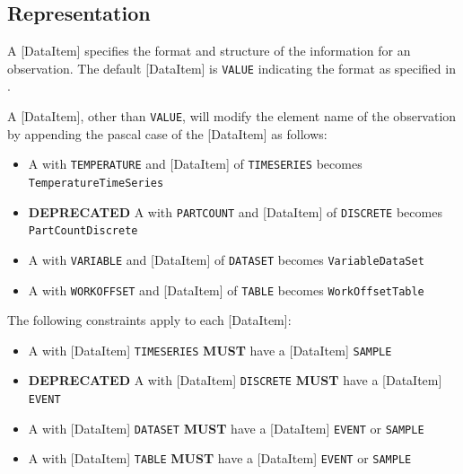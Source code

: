 \subsection{Representation} \label{sec:Representation}


A [DataItem] specifies the format and structure of the information for an \gls{observation}. The default [DataItem] is \texttt{VALUE} indicating the format as specified in .

A [DataItem], other than \texttt{VALUE}, will modify the element name of the \gls{observation} by appending the pascal case of the [DataItem] as follows:


\begin{itemize}
    \item A  with  \texttt{TEMPERATURE} and [DataItem] of \texttt{TIME\textunderscore SERIES} becomes \texttt{TemperatureTimeSeries}


    \item \textbf{DEPRECATED} A  with  \texttt{PART\textunderscore COUNT} and [DataItem] of \texttt{DISCRETE} becomes \texttt{PartCountDiscrete}


    \item A  with  \texttt{VARIABLE} and [DataItem] of \texttt{DATA\textunderscore SET} becomes \texttt{VariableDataSet}


    \item A  with  \texttt{WORK\textunderscore OFFSET} and [DataItem] of \texttt{TABLE} becomes \texttt{WorkOffsetTable}


\end{itemize}

The following constraints apply to each [DataItem]:


\begin{itemize}
    \item A  with [DataItem] \texttt{TIME\textunderscore SERIES} \textbf{MUST} have a [DataItem] \texttt{SAMPLE}


    \item \textbf{DEPRECATED} A  with [DataItem] \texttt{DISCRETE} \textbf{MUST} have a [DataItem] \texttt{EVENT}


    \item A  with [DataItem] \texttt{DATA\textunderscore SET} \textbf{MUST} have a [DataItem] \texttt{EVENT} or \texttt{SAMPLE}


    \item A  with [DataItem] \texttt{TABLE} \textbf{MUST} have a [DataItem] \texttt{EVENT} or \texttt{SAMPLE}

\end{itemize}

